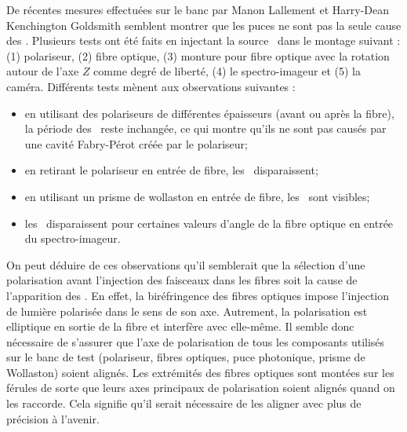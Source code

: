 De récentes mesures effectuées sur le banc par Manon Lallement et Harry-Dean Kenchington Goldsmith semblent montrer que les puces ne sont pas la seule cause des \wiggles. Plusieurs tests ont été faits en injectant la source \sk~dans le montage suivant : (1) polariseur, (2) fibre optique, (3) monture pour fibre optique avec la rotation autour de l'axe $Z$ comme degré de liberté, (4) le spectro-imageur et (5) la caméra. Différents tests mènent aux observations suivantes :

\begin{itemize}
    \item en utilisant des polariseurs de différentes épaisseurs (avant ou après la fibre), la période des \wiggles~reste inchangée, ce qui montre qu'ils ne sont pas causés par une cavité Fabry-Pérot créée par le polariseur;
    \item en retirant le polariseur en entrée de fibre, les \wiggles~disparaissent;
    \item en utilisant un prisme de wollaston en entrée de fibre, les \wiggles~sont visibles;
    \item les \wiggles~disparaissent pour certaines valeurs d'angle de la fibre optique en entrée du spectro-imageur.
\end{itemize}

On peut déduire de ces observations qu'il semblerait que la sélection d'une polarisation avant l'injection des faisceaux dans les fibres soit la cause de l'apparition des \wiggles. En effet, la biréfringence des fibres optiques impose l'injection de lumière polarisée dans le sens de son axe. Autrement, la polarisation est elliptique en sortie de la fibre et interfère avec elle-même. Il semble donc nécessaire de s'assurer que l'axe de polarisation de tous les composants utilisés sur le banc de test (polariseur, fibres optiques, puce photonique, prisme de Wollaston) soient alignés. Les extrémités des fibres optiques sont montées sur les férules de sorte que leurs axes principaux de polarisation soient alignés quand on les raccorde. Cela signifie qu'il serait nécessaire de les aligner avec plus de précision à l'avenir.

